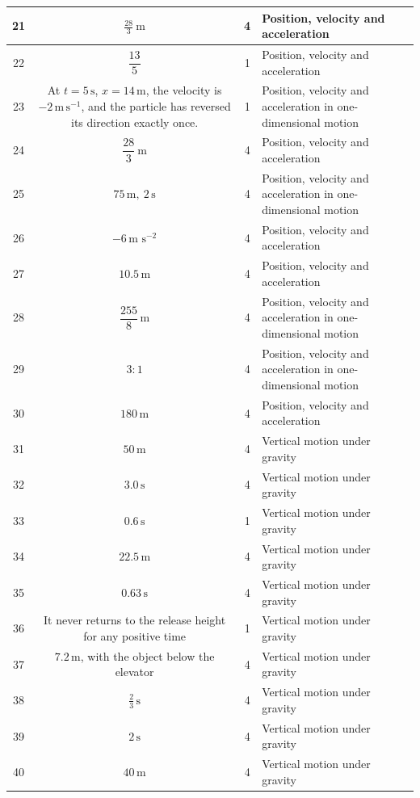 \documentclass[11pt,a4paper]{article}
\begin{document}
\begin{tabularx}{\linewidth}{|c|c|c|X|}
21 & $\frac{28}{3}\ \text{m}$ & 4 & Position, velocity and acceleration \\\hline
22 & $\dfrac{13}{5}$ & 1 & Position, velocity and acceleration \\\hline
23 & At $t=5\,\mathrm{s}$, $x=14\,\mathrm{m}$, the velocity is $-2\,\mathrm{m\,s^{-1}}$, and the particle has reversed its direction exactly once. & 1 & Position, velocity and acceleration in one-dimensional motion \\\hline
24 & $\dfrac{28}{3}\ \mathrm{m}$ & 4 & Position, velocity and acceleration \\\hline
25 & $75\,\mathrm{m},\ 2\,\mathrm{s}$ & 4 & Position, velocity and acceleration in one-dimensional motion \\\hline
26 & $-6\,\text{m s}^{-2}$ & 4 & Position, velocity and acceleration \\\hline
27 & \(10.5\,\text{m}\) & 4 & Position, velocity and acceleration \\\hline
28 & $\dfrac{255}{8}\,\mathrm{m}$ & 4 & Position, velocity and acceleration in one-dimensional motion \\\hline
29 & $3:1$ & 4 & Position, velocity and acceleration in one-dimensional motion \\\hline
30 & $180\,\text{m}$ & 4 & Position, velocity and acceleration \\\hline
31 & \(50\,\text{m}\) & 4 & Vertical motion under gravity \\\hline
32 & $3.0\,\text{s}$ & 4 & Vertical motion under gravity \\\hline
33 & $0.6\,\mathrm{s}$ & 1 & Vertical motion under gravity \\\hline
34 & $22.5\,\text{m}$ & 4 & Vertical motion under gravity \\\hline
35 & $0.63\,\mathrm{s}$ & 4 & Vertical motion under gravity \\\hline
36 & It never returns to the release height for any positive time & 1 & Vertical motion under gravity \\\hline
37 & \(7.2\,\mathrm{m}\), with the object below the elevator & 4 & Vertical motion under gravity \\\hline
38 & $\frac{2}{3}\,\text{s}$ & 4 & Vertical motion under gravity \\\hline
39 & $2\,\text{s}$ & 4 & Vertical motion under gravity \\\hline
40 & \(40\,\text{m}\) & 4 & Vertical motion under gravity \\\hline
\end{tabularx}
\end{document}
